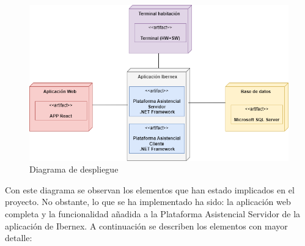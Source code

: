 \begin{figure}[!h]
    \centering
    \includegraphics[width=15cm]{Imagenes/Arquitectura-despliegue}
    \caption{Diagrama de despliegue}
    \label{fig:despliegue}
\end{figure}

Con este diagrama se observan los elementos que han estado implicados en el proyecto. No obstante, lo que se ha implementado ha sido: la aplicación web completa y la funcionalidad añadida a la Plataforma Asistencial Servidor de la aplicación de Ibernex. A continuación se describen los elementos con mayor detalle:

